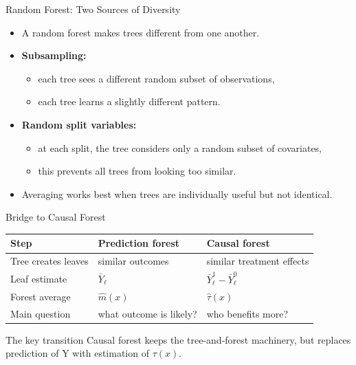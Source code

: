 \documentclass[hyperref={pdfpagelabels=false}]{beamer}
\begin{document}
\begin{frame}{Random Forest: Two Sources of Diversity}
\begin{itemize}
  \item A random forest makes trees different from one another.
  \vspace{0.25cm}
  \item \textbf{Subsampling:}
  \begin{itemize}
    \item each tree sees a different random subset of observations,
    \item each tree learns a slightly different pattern.
  \end{itemize}
  \vspace{0.25cm}
  \item \textbf{Random split variables:}
  \begin{itemize}
    \item at each split, the tree considers only a random subset of covariates,
    \item this prevents all trees from looking too similar.
  \end{itemize}
  \vspace{0.25cm}
  \item Averaging works best when trees are individually useful but not identical.
\end{itemize}
\end{frame}

\begin{frame}{Bridge to Causal Forest}
\begin{center}
\small
\begin{tabular}{lll}
\toprule
Step & Prediction forest & Causal forest \\
\midrule
Tree creates leaves & similar outcomes & similar treatment effects \\
Leaf estimate & $\bar{Y}_{\ell}$ & $\bar{Y}^{1}_{\ell}-\bar{Y}^{0}_{\ell}$ \\
Forest average & $\hat{m}(x)$ & $\hat{\tau}(x)$ \\
Main question & what outcome is likely? & who benefits more? \\
\bottomrule
\end{tabular}
\end{center}

\vspace{0.3cm}
\begin{block}{The key transition}
Causal forest keeps the tree-and-forest machinery, but replaces prediction of $\mathrm{Y}$ with estimation of $\tau(x)$.
\end{block}
\end{frame}
\end{document}
